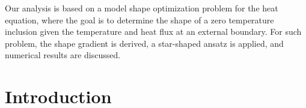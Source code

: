 \documentclass[english,a4paper,9pt,oneside]{scrbook}	%
\theoremstyle{break}
\theoremstyle{remark}
\begin{document}

Our analysis is based on a model shape optimization problem for the heat equation, where the goal is to determine the shape of a zero temperature inclusion given the temperature and heat flux at an external boundary. For such problem, the shape gradient is derived, a star-shaped ansatz is applied, and numerical results are discussed.

%
%
%



\newpage
\tableofcontents  


\chapter{Introduction}  \setcounter{page}{1}   %
\end{document}
